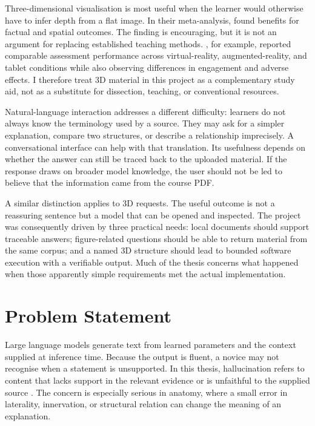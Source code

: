 Three-dimensional visualisation is most useful when the learner would otherwise have to infer depth from a flat image. In their meta-analysis, \textcite{yammine2015} found benefits for factual and spatial outcomes. The finding is encouraging, but it is not an argument for replacing established teaching methods. \textcite{moro2017}, for example, reported comparable assessment performance across virtual-reality, augmented-reality, and tablet conditions while also observing differences in engagement and adverse effects. I therefore treat 3D material in this project as a complementary study aid, not as a substitute for dissection, teaching, or conventional resources.

Natural-language interaction addresses a different difficulty: learners do not always know the terminology used by a source. They may ask for a simpler explanation, compare two structures, or describe a relationship imprecisely. A conversational interface can help with that translation. Its usefulness depends on whether the answer can still be traced back to the uploaded material. If the response draws on broader model knowledge, the user should not be led to believe that the information came from the course PDF.

A similar distinction applies to 3D requests. The useful outcome is not a reassuring sentence but a model that can be opened and inspected. The project was consequently driven by three practical needs: local documents should support traceable answers; figure-related questions should be able to return material from the same corpus; and a named 3D structure should lead to bounded software execution with a verifiable output. Much of the thesis concerns what happened when those apparently simple requirements met the actual implementation.

\section{Problem Statement}
\label{sec:introduction-problem}

Large language models generate text from learned parameters and the context supplied at inference time. Because the output is fluent, a novice may not recognise when a statement is unsupported. In this thesis, hallucination refers to content that lacks support in the relevant evidence or is unfaithful to the supplied source \parencite{ji2023}. The concern is especially serious in anatomy, where a small error in laterality, innervation, or structural relation can change the meaning of an explanation.

